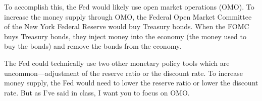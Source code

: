 \documentclass[
    letterpaper,paper=portrait,fleqn,
    DIV=16,fontsize=12pt,twoside=semi,
    parskip=full-,
    headings=standardclasses]
{scrartcl}
\begin{document}
\begin{enumerate}
\begin{solution}
To accomplish this, the Fed would likely use open market operations (OMO). To increase the money supply through OMO, the Federal Open Market Committee of the New York Federal Reserve would buy Treasury bonds. When the FOMC buys Treasury bonds, they inject money into the economy (the money used to buy the bonds) and remove the bonds from the economy.

The Fed could technically use two other monetary policy tools which are uncommon---adjustment of the reserve ratio or the discount rate. To increase money supply, the Fed would need to lower the reserve ratio or lower the discount rate. But as I've said in class, I want you to focus on OMO.
\end{solution}

\end{enumerate}
\end{document}
